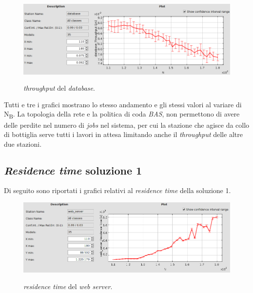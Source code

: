 \documentclass[../main.tex]{subfiles}
\begin{document}
    \begin{figure}[H]
        \centering
        \includegraphics[scale = 0.45]{assets/db_th_1.png}\\
        \caption[\textit{Throughput} del \textit{database}]{\textit{throughput} del \textit{database}.}
        \label{fig:throughput-time-db}
    \end{figure}
    Tutti e tre i grafici mostrano lo stesso andamento e gli stessi valori al variare di N\textsubscript{B}.
    La topologia della rete e la politica di coda \textit{BAS}, non permettono di avere delle perdite nel numero di
    \textit{jobs} nel sistema, per cui la stazione che agisce da collo di bottiglia serve tutti i lavori in attesa
    limitando anche il \textit{throughput} delle altre due stazioni.

    \subsection{\textit{Residence time} soluzione 1}\label{subsec:residence-time-soluzione-1}
    Di seguito sono riportati i grafici relativi al \textit{residence time} della soluzione 1.
    \begin{figure}[H]
        \centering
        \includegraphics[scale = 0.45]{assets/ws_res_1.png}\\
        \caption[\textit{Residence time} del \textit{web server}]{\textit{residence time} del \textit{web server}.}
        \label{fig:residence-time-ws}
    \end{figure}
\end{document}
